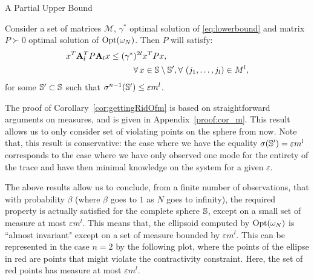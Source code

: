 \begin{subsection}{A Partial Upper Bound}
\begin{cor}\label{cor:gettingRidOfm}
Consider a set of matrices $\mathcal{M}$, $\gamma^{*}$ optimal solution of \eqref{eq:lowerbound} and matrix $P \succ 0$ optimal solution of $\text{Opt}(\omega_N)$. Then $P$ will satisfy:
\begin{equation}\label{eqn:P0}
\begin{aligned}
&x^T \mathbf{A}_l^T P\mathbf{A}_l x\leq (\gamma^{*})^{2l} x^T P x, \\
& \qquad \qquad \qquad \qquad \forall\, x \in \mathbb{S} \setminus \mathbb{S}', \forall\ (j_1, \dots, j_l) \in M^l,
\end{aligned}
\end{equation}
for some $\mathbb{S}' \subset \mathbb{S}$ such that $\sigma^{n-1}(\mathbb{S}') \leq \varepsilon m^l $.
\end{cor}

The proof of Corollary~\ref{cor:gettingRidOfm} is based on straightforward arguments on measures, and is given in Appendix~\ref{proof:cor_m}. This result allows us to only consider set of violating points on the sphere from now. Note that, this result is conservative: the case where we have the equality $\sigma(\mathbb{S}') = \varepsilon m^l$ corresponds to the case where we have only observed one mode for the entirety of the trace and have then minimal knowledge on the system for a given $\varepsilon$.


The above results allow us to conclude, from a finite number of observations, that with probability $\beta$ (where $\beta$ goes to $1$ as $N$ goes to infinity), the required property is actually satisfied for the complete sphere $\mathbb{S}$, except on a small set of measure at most $\varepsilon m^l$. This means that, the ellipsoid computed by $\text{Opt}(\omega_N)$ is ``almost invariant"  except on a set of measure bounded by $\varepsilon m^l$. This can be represented in the case $n=2$ by the following plot, where the points of the ellipse in red are points that might violate the contractivity constraint. Here, the set of red points has measure at most $\varepsilon m^l$.

\begin{figure}[H]\label{fig:ellipsoid}
\begin{center}
\end{center}
\end{figure}
\end{subsection}
